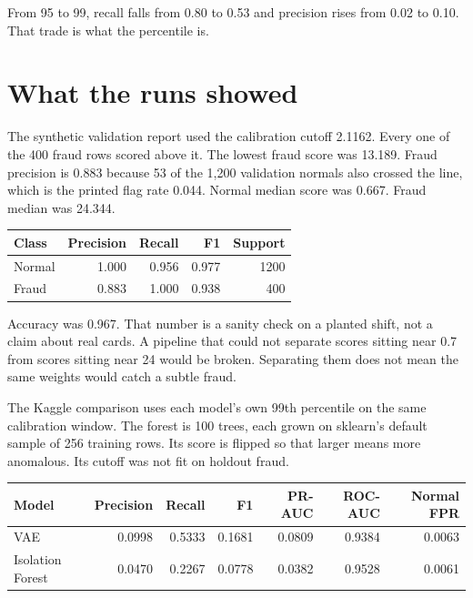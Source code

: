 \documentclass[11pt]{article}
\begin{document}
From 95 to 99, recall falls from 0.80 to 0.53 and precision rises from
0.02 to 0.10. That trade is what the percentile is.

\section{What the runs showed}

The synthetic validation report used the calibration cutoff 2.1162.
Every one of the 400 fraud rows scored above it. The lowest fraud score
was 13.189. Fraud precision is 0.883 because 53 of the 1{,}200 validation
normals also crossed the line, which is the printed flag rate 0.044.
Normal median score was 0.667. Fraud median was 24.344.

\begin{center}
\small
\begin{tabular}{@{}lrrrr@{}}
\toprule
Class & Precision & Recall & F1 & Support \\
\midrule
Normal & 1.000 & 0.956 & 0.977 & 1200 \\
Fraud  & 0.883 & 1.000 & 0.938 & 400 \\
\bottomrule
\end{tabular}
\end{center}

Accuracy was 0.967. That number is a sanity check on a planted shift,
not a claim about real cards. A pipeline that could not separate scores
sitting near 0.7 from scores sitting near 24 would be broken. Separating
them does not mean the same weights would catch a subtle fraud.

The Kaggle comparison uses each model's own 99th percentile on the same
calibration window. The forest is 100 trees, each grown on sklearn's
default sample of 256 training rows. Its score is flipped so that larger
means more anomalous. Its cutoff was not fit on holdout fraud.

\begin{center}
\small
\begin{tabular}{@{}lrrrrrr@{}}
\toprule
Model & Precision & Recall & F1 & PR-AUC & ROC-AUC & Normal FPR \\
\midrule
VAE & 0.0998 & 0.5333 & 0.1681 & 0.0809 & 0.9384 & 0.0063 \\
Isolation Forest & 0.0470 & 0.2267 & 0.0778 & 0.0382 & 0.9528 & 0.0061 \\
\bottomrule
\end{tabular}
\end{center}
\end{document}
